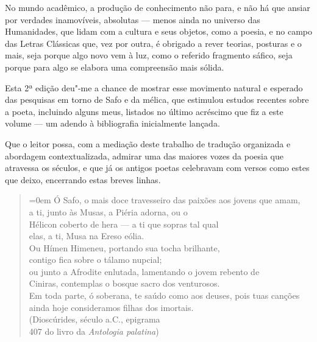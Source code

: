 No mundo acadêmico, a produção de conhecimento não para, e não há que
ansiar por verdades inamovíveis, absolutas --- menos ainda no universo
das Humanidades, que lidam com a cultura e seus objetos, como a poesia,
e no campo das Letras Clássicas que, vez por outra, é obrigado a rever
teorias, posturas e o mais, seja porque algo novo vem à luz, como o referido fragmento sáfico, seja porque para algo se elabora uma compreensão mais
sólida.

Esta 2ª edição deu"-me a chance de mostrar esse movimento natural e
esperado das pesquisas em torno de Safo e da mélica, que estimulou
estudos recentes sobre a poeta, incluindo alguns meus, listados no
último acréscimo que fiz a este volume --- um adendo à bibliografia
inicialmente lançada.

Que o leitor possa, com a mediação deste trabalho de tradução organizada
e abordagem contextualizada, admirar uma das maiores vozes da poesia que
atravessa os séculos, e que já os antigos poetas celebravam com versos
como estes que deixo, encerrando estas breves linhas.

\begin{quote}\parindent=0em
Ó Safo, o mais doce travesseiro das paixões aos jovens que amam,\\
a ti, junto às Musas, a Piéria adorna, ou o\\
Hélicon coberto de hera --- a ti que sopras tal qual\\
elas, a ti, Musa na Ereso eólia.\\
Ou Hímen Himeneu, portando sua tocha brilhante,\\
contigo fica sobre o tálamo nupcial;\\
ou junto a Afrodite enlutada, lamentando o jovem rebento de\\
Ciniras, contemplas o bosque sacro dos venturosos.\\
Em toda parte, ó soberana, te saúdo como aos deuses, pois tuas \qb{}canções\\
ainda hoje consideramos filhas dos imortais.\\
\mbox{}\hfill{}(Dioscúrides, século  a.C., epigrama\\
\mbox{}\hfill{}407 do livro  da \emph{Antologia palatina})
\end{quote}


